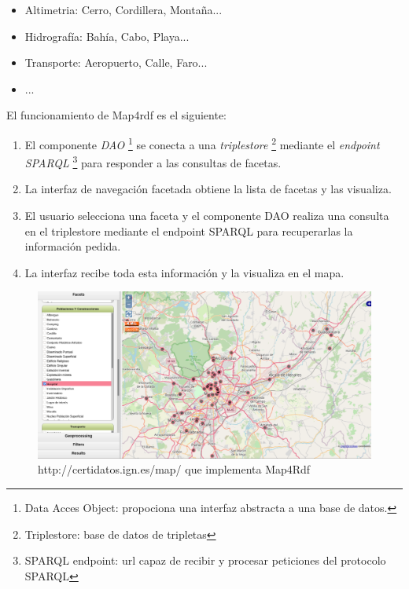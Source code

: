 \begin{itemize}
    \item Altimetria: Cerro, Cordillera, Montaña...
    \item Hidrografía: Bahía, Cabo, Playa...
    \item Transporte: Aeropuerto, Calle, Faro...
    \item ...
\end{itemize}

El funcionamiento de Map4rdf es el siguiente:
\begin{enumerate}

    \item El componente \textit{DAO} \footnote{Data Acces Object: propociona una interfaz abstracta a una base de
        datos.} se conecta a una \textit{triplestore} \footnote{Triplestore: base de datos de tripletas} mediante
        el \textit{endpoint SPARQL} \footnote{SPARQL endpoint: url capaz de recibir y procesar peticiones del
        protocolo SPARQL} para responder a las consultas de facetas. 

    \item La interfaz de navegación facetada obtiene la lista de facetas y las visualiza. 

    \item El usuario selecciona una faceta y el componente DAO realiza una consulta en el
        triplestore mediante el endpoint SPARQL para recuperarlas la información pedida.

    \item La interfaz recibe toda esta información y la visualiza en el mapa.

\end{enumerate}

\begin{figure}[h]
    \includegraphics[width=\textwidth]{images/map4rdf.png}
    \centering
    \caption{http://certidatos.ign.es/map/ que implementa Map4Rdf}
    \label{fig:map4rdf}
\end{figure}


